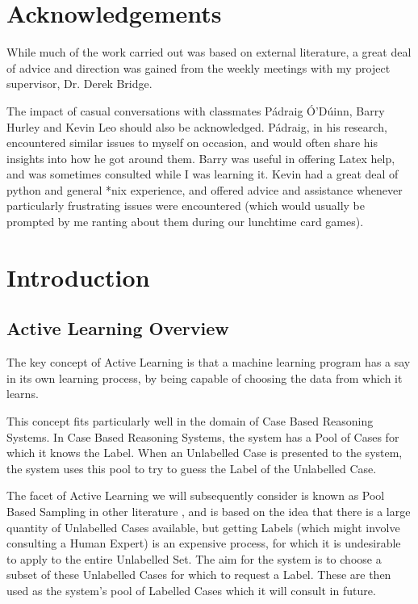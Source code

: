 \documentclass[a4paper,11pt]{report}
\begin{document}
\chapter*{Acknowledgements}
While much of the work carried out was based on external literature, a great deal of advice and direction was gained from the weekly meetings with my project supervisor, Dr. Derek Bridge.

The impact of casual conversations with classmates P\'{a}draig \'{O}'D\'{u}inn, Barry Hurley and Kevin Leo should also be acknowledged. P\'{a}draig, in his research, encountered similar issues to myself on occasion, and would often share his insights into how he got around them. Barry was useful in offering Latex help, and was sometimes consulted while I was learning it. Kevin had a great deal of python and general *nix experience, and offered advice and assistance whenever particularly frustrating issues were encountered (which would usually be prompted by me ranting about them during our lunchtime card games).

\tableofcontents

\chapter{Introduction}
\section{Active Learning Overview}
The key concept of Active Learning is that a machine learning program has a say in its own learning process, by being capable of choosing the data from which it learns. 

This concept fits particularly well in the domain of Case Based Reasoning Systems. In Case Based Reasoning Systems, the system has a Pool of Cases for which it knows the Label. When an Unlabelled Case is presented to the system, the system uses this pool to try to guess the Label of the Unlabelled Case.

The facet of Active Learning we will subsequently consider is known as Pool Based Sampling in other literature \citep{Settles2010}, and is based on the idea that there is a large quantity of Unlabelled Cases available, but getting Labels (which might involve consulting a Human Expert) is an expensive process, for which it is undesirable to apply to the entire Unlabelled Set. The aim for the system is to choose a subset of these Unlabelled Cases for which to request a Label. These are then used as the system's pool of Labelled Cases which it will consult in future.
\end{document}
